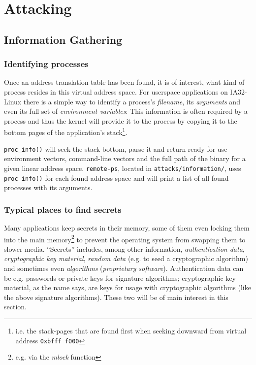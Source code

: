 %
%

\section{Attacking}




\subsection{Information Gathering}

\subsubsection{Identifying processes}

Once an address translation table has been found, it is of interest, what kind
of process resides in this virtual address space.  For userspace applications on
IA32-Linux there is a simple way to identify a process's \emph{filename}, its
\emph{arguments} and even its full set of \emph{environment variables}: This
information is often required by a process and thus the kernel will provide it
to the process by copying it to the bottom pages of the application's
stack\footnote{i.e.  the stack-pages that are found first when seeking downward
from virtual address \texttt{0xbfff~f000}}.

\texttt{proc\_info()} will seek the stack-bottom, parse it and return
ready-for-use environment vectors, command-line vectors and the full path of the
binary for a given linear address space. \texttt{remote-ps}, located in
\texttt{attacks/information/}, uses \texttt{proc\_info()} for each found address
space and will print a list of all found processes with its arguments.


\subsubsection{Typical places to find secrets}

Many applications keep secrets in their memory, some of them even locking them
into the main memory\footnote{e.g. via the \emph{mlock} function} to prevent the
operating system from swapping them to slower media. ``Secrets'' includes, among
other information, \emph{authentication data}, \emph{cryptographic key
material}, \emph{random data} (e.g. to seed a cryptographic algorithm) and
sometimes even \emph{algorithms} (\emph{proprietary software}). Authentication
data can be e.g.  passwords or private keys for signature algorithms;
cryptographic key material, as the name says, are keys for usage with
cryptographic algorithms (like the above signature algorithms). These two will
be of main interest in this section.

